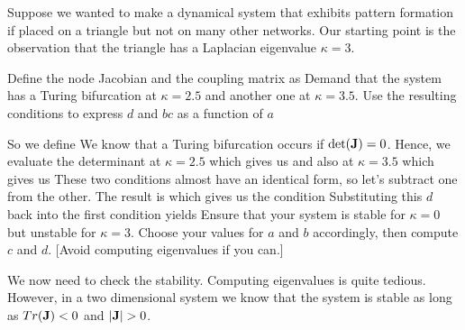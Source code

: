Suppose we wanted to make a dynamical system that exhibits pattern formation if placed on a triangle but not on many other networks. Our starting point is the observation that the triangle has a Laplacian eigenvalue $\kappa=3$.

\subquestion
Define the node Jacobian and the coupling matrix as
Demand that the system has a Turing bifurcation at $\kappa=2.5$ and another one at $\kappa=3.5$. Use the resulting conditions to express $d$ and $bc$ as a function of $a$

\solution 
So we define 
We know that a Turing bifurcation occurs if ${\rm det}({\bf J})=0$. Hence, we evaluate the determinant at $\kappa=2.5$ which gives us   
and also at $\kappa=3.5$ which gives us
These two conditions almost have an identical form, so let's subtract one from the other. The result is 
which gives us the condition 
Substituting this $d$ back into the first condition yields 
\subquestion 
Ensure that your system is stable for $\kappa=0$ but unstable for $\kappa=3$. Choose your values for $a$ and $b$ accordingly, then compute $c$ and $d$. [Avoid computing eigenvalues if you can.]

\solution 
We now need to check the stability. Computing eigenvalues is quite tedious. However, in a two dimensional system we know that the system is stable as long as ${Tr}({\bf J})<0$ and $|{\bf J}|>0$. 

